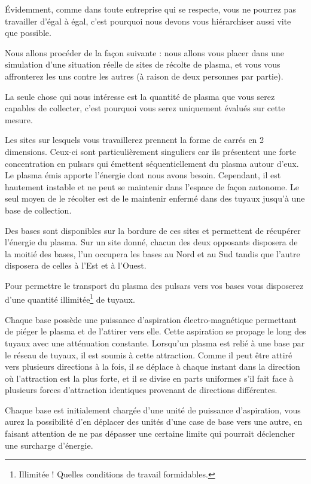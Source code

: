 Évidemment, comme dans toute entreprise qui se respecte, vous ne pourrez pas
travailler d'égal à égal, c'est pourquoi nous devons vous hiérarchiser aussi
vite que possible.

Nous allons procéder de la façon suivante : nous allons vous placer dans une
simulation d'une situation réelle de sites de récolte de plasma, et vous vous
affronterez les uns contre les autres (à raison de deux personnes par partie).

La seule chose qui nous intéresse est la quantité de plasma que vous serez
capables de collecter, c'est pourquoi vous serez uniquement évalués sur cette
mesure.

Les sites sur lesquels vous travaillerez prennent la forme de carrés en 2
dimensions. Ceux-ci sont particulièrement singuliers car ils présentent une
forte concentration en pulsars qui émettent séquentiellement du plasma autour
d'eux. Le plasma émis apporte l'énergie dont nous avons besoin. Cependant, il
est hautement instable et ne peut se maintenir dans l'espace de façon autonome.
Le seul moyen de le récolter est de le maintenir enfermé dans des tuyaux
jusqu'à une base de collection.

Des bases sont disponibles sur la bordure de ces sites et permettent de
récupérer l'énergie du plasma. Sur un site donné, chacun des deux opposants
disposera de la moitié des bases, l'un occupera les bases au Nord et au Sud
tandis que l'autre disposera de celles à l'Est et à l'Ouest.

Pour permettre le transport du plasma des pulsars vers vos bases vous
disposerez d'une quantité illimitée\footnote{Illimitée ! Quelles conditions de
travail formidables.} de tuyaux.

Chaque base possède une puissance d'aspiration électro-magnétique permettant de
piéger le plasma et de l'attirer vers elle. Cette aspiration se propage le long
des tuyaux avec une atténuation constante.  Lorsqu'un plasma est relié à une
base par le réseau de tuyaux, il est soumis à cette attraction. Comme il peut
être attiré vers plusieurs directions à la fois, il se déplace à chaque instant
dans la direction où l'attraction est la plus forte, et il se divise en parts
uniformes s'il fait face à plusieurs forces d'attraction identiques provenant
de directions différentes.

Chaque base est initialement chargée d'une unité de puissance d'aspiration,
vous aurez la possibilité d'en déplacer des unités d'une case de base vers une
autre, en faisant attention de ne pas dépasser une certaine limite qui pourrait
déclencher une surcharge d'énergie.

